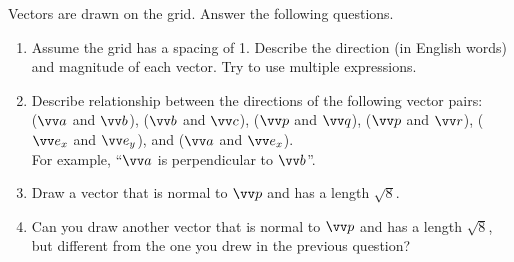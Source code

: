 \documentclass[11pt,pdfa,lastpage]{MishoNote}
\begin{document}
\begin{problems}
 \Problem[S] {}\label{q:vecbasic} Vectors are drawn on the grid. Answer the following questions.
 \par\smallskip\par\usebox{\VectorSetA}

\begin{enumerate}
  \item Assume the grid has a spacing of 1. Describe the direction (in English words) and magnitude of each vector. Try to use multiple expressions.
  \item Describe relationship between the directions of the following vector pairs:\\
   ($\vc a$ and $\vc b$), ($\vc b$ and $\vc c$), ($\vc p$ and $\vc q$), ($\vc p$ and $\vc r$), ($\vvex$ and $\vvey$), and ($\vc a$ and $\vvex$).\\
   For example, ``$\vc a$ is perpendicular to $\vc b$''.
   \item Draw a vector that is normal to $\vc p$ and has a length $\sqrt 8$.
   \item Can you draw another vector that is normal to $\vc p$ and has a length $\sqrt 8$, but different from the one you drew in the previous question?
\end{enumerate}

\end{problems}
\end{document}
